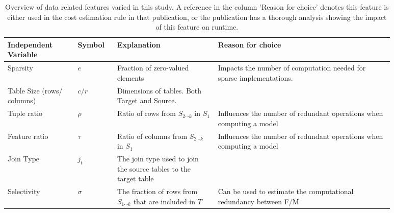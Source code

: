 \begingroup
\renewcommand{\arraystretch}{1.5}
\begin{table}[t]
  \centering
  \begin{tabular}{p{0.16\linewidth}p{0.09\linewidth}p{0.23\linewidth}p{0.4\linewidth}}
    \toprule
    Independent Variable       & Symbol   & Explanation                                                        & Reason for choice                                                                                               \\ \midrule \midrule
    Sparsity                   & $e$      & Fraction of zero-valued elements                                   & Impacts the number of computation needed for sparse implementations.~\cite{MorpheusFI, morpheus, amalur_tkde24} \\
    Table Size (rows/ columns) & $c/r$    & Dimensions of tables. Both Target and Source.                      & ~\cite{morpheus, amalur_tkde24}                                                                                 \\
    Tuple ratio                & $\rho$   & Ratio of rows from $S_{2\cdots k}$ in $S_1$                        & Influences the number of redundant operations when computing a model~\cite{morpheus, amalur_tkde24}             \\
    Feature ratio              & $\tau$   & Ratio of columns from $S_{2\cdots k}$ in $S_1$                     & Influences the number of redundant operations when computing a model~\cite{morpheus, amalur_tkde24}             \\
    Join Type                  & $j_t$    & The join type used to join the source tables to the target table   & ~\cite{amalur_tkde24}                                                                                           \\
    Selectivity                & $\sigma$ & The fraction of rows from $S_{1\cdots k}$ that are included in $T$ & Can be used to estimate the computational redundancy between F/M~\cite{MorpheusFI, amalur_tkde24}               \\
    \bottomrule
  \end{tabular}
  \caption[Overview of data related features varied in this study]{Overview of data related features varied in this study. A reference in the column 'Reason for choice' denotes this feature is either used in the cost estimation rule in that publication, or the publication has a thorough analysis showing the impact of this feature on runtime.}
  \label{tab:4-data_chars}
\end{table}
\endgroup

